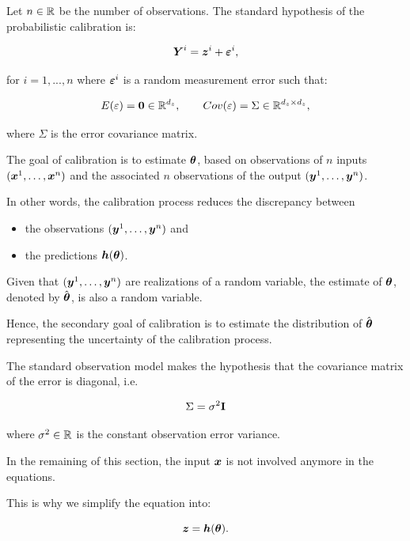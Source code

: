 \documentclass{beamer}
\begin{document}

\begin{frame}
Let $n \in \mathbb{R}$ be the number of observations. The standard
hypothesis of the probabilistic calibration is:

$$
       \boldsymbol{Y}^i = \boldsymbol{z}^i + \boldsymbol{\varepsilon}^i,
$$

for $i=1,...,n$ where $\boldsymbol{\varepsilon}^i$ is a random
measurement error such that:

$$
       E(\varepsilon)=\boldsymbol{0} \in \mathbb{R}^{d_z}, \qquad Cov(\varepsilon)=\Sigma \in \mathbb{R}^{d_z\times d_z},
$$

where $\Sigma$ is the error covariance matrix.

\end{frame}


\begin{frame}
The goal of calibration is to estimate $\boldsymbol{\theta}$, based on
observations of $n$ inputs
$(\boldsymbol{x}^1, \ldots, \boldsymbol{x}^n)$ and the associated $n$
observations of the output $(\boldsymbol{y}^1, \ldots, \boldsymbol{y}^n)$. 

In other words, the calibration process reduces the discrepancy between 
\begin{itemize}
\item  the observations $(\boldsymbol{y}^1, \ldots, \boldsymbol{y}^n)$ and 
\item  the predictions $\boldsymbol{h}(\boldsymbol{\theta})$. 
\end{itemize}

Given that $(\boldsymbol{y}^1, \ldots, \boldsymbol{y}^n)$ are realizations of a random
variable, the estimate of $\boldsymbol{\theta}$, denoted by
$\hat{\boldsymbol{\theta}}$, is also a random variable. 

Hence, the secondary goal of calibration is to estimate the distribution of
$\hat{\boldsymbol{\theta}}$ representing the uncertainty of the
calibration process.

\end{frame}


\begin{frame}
The standard observation model makes the hypothesis that the covariance
matrix of the error is diagonal, i.e.

$$
       \Sigma = \sigma^2 {\bf I}
$$

where $\sigma^2 \in \mathbb{R}$ is the constant observation error
variance.

In the remaining of this section, the input $\boldsymbol{x}$ is not
involved anymore in the equations. 

This is why we simplify the equation into:

$$
       \boldsymbol{z} = \boldsymbol{h}(\boldsymbol{\theta}).
$$
\end{frame}
\end{document}
